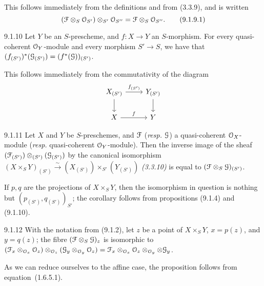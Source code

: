 \documentclass[../main.tex]{subfiles}
\begin{document}
This follows immediately from the definitions and from (3.3.9), and is written
\begin{equation*}
    (\mathcal{F}\otimes_S\mathcal{O}_{S'})\otimes_{S'}\mathcal{O}_{S''} = \mathcal{F}\otimes_S\mathcal{O}_{S''}.\tag{9.1.9.1}
\end{equation*}

\begin{cx}[Proposition]{9.1.10}
    Let $Y$ be an $S$-prescheme, and $f\colon X\to Y$ an $S$-morphism.
    For every quasi-coherent $\mathcal{O}_Y$-module and every morphism $S'\to S$, we have that $(f_{(S')})^*(\mathcal{G}_{(S')})=(f^*(\mathcal{G}))_{(S')}$.
\end{cx}

This follows immediately from the commutativity of the diagram
\begin{equation*}
    \begin{tikzcd}
        X_{(S')}
            \ar{r}{f_{(S')}}
            \ar{d}
        & Y_{(S')}
            \ar{d}\\
        X
            \ar{r}{f}
        & Y
    \end{tikzcd}
\end{equation*}

\begin{cx}[Corollary]{9.1.11}
    Let $X$ and $Y$ be $S$-preschemes, and $\mathcal{F}$ (\emph{resp.} $\mathcal{G}$) a quasi-coherent $\mathcal{O}_X$-module (\emph{resp.} quasi-coherent $\mathcal{O}_Y$-module).
    Then the inverse image of the sheaf $(\mathcal{F}_{(S')})\otimes_{(S')}(\mathcal{G}_{(S')})$ by the canonical isomorphism $(X\times_S Y)_{(S')}\xrightarrow{\sim}(X_{(S')})\times_{S'}(Y_{(S')})$ \emph{(3.3.10)} is equal to $(\mathcal{F}\otimes_S\mathcal{G})_{(S')}$.
\end{cx}

If $p,q$ are the projections of $X\times_S Y$, then the isomorphism in question is nothing but $(p_{(S')}, q_{(S')})_{S'}$; the corollary follows from propositions (9.1.4) and (9.1.10).

\begin{cx}[Proposition]{9.1.12}
    With the notation from (9.1.2), let $z$ be a point of $X\times_S Y$, $x=p(z)$, and $y=q(z)$; the fibre $(\mathcal{F}\otimes_S\mathcal{G})_z$ is isomorphic to $(\mathcal{F}_x\otimes_{\mathcal{O}_x}\mathcal{O}_z)\otimes_{\mathcal{O}_z}(\mathcal{G}_y\otimes_{\mathcal{O}_y}\mathcal{O}_z) = \mathcal{F}_x\otimes_{\mathcal{O}_x}\mathcal{O}_z\otimes_{\mathcal{O}_y}\otimes\mathcal{G}_y$.
\end{cx}

As we can reduce ourselves to the affine case, the proposition follows from equation~(1.6.5.1).
\end{document}
